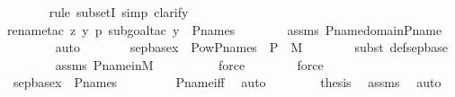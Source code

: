 \begin{isabellebody}
\ \ \ \ \ \ \isamarkupfalse%
{\isacharparenleft}{\kern0pt}rule\ subsetI{\isacharcomma}{\kern0pt}\ simp{\isacharcomma}{\kern0pt}\ clarify{\isacharparenright}{\kern0pt}\isanewline
\ \ \ \ \ \ \isamarkupfalse%
{\isacharparenleft}{\kern0pt}rename{\isacharunderscore}{\kern0pt}tac\ z\ y\ p{\isacharcomma}{\kern0pt}\ subgoal{\isacharunderscore}{\kern0pt}tac\ {\isachardoublequoteopen}y\ {\isasymin}\ P{\isacharunderscore}{\kern0pt}names{\isachardoublequoteclose}{\isacharparenright}{\kern0pt}\isanewline
\ \ \ \ \ \ \isamarkupfalse%
\ assms\ P{\isacharunderscore}{\kern0pt}name{\isacharunderscore}{\kern0pt}domain{\isacharunderscore}{\kern0pt}P{\isacharunderscore}{\kern0pt}name\isanewline
\ \ \ \ \ \ \isamarkupfalse%
\ auto\isanewline
\ \ \ \ \isamarkupfalse%
\ \isamarkupfalse%
\ {\isachardoublequoteopen}sep{\isacharunderscore}{\kern0pt}base{\isacharparenleft}{\kern0pt}x{\isacharparenright}{\kern0pt}\ {\isasymsubseteq}\ Pow{\isacharparenleft}{\kern0pt}P{\isacharunderscore}{\kern0pt}names\ {\isasymtimes}\ P{\isacharparenright}{\kern0pt}\ {\isasyminter}\ M{\isachardoublequoteclose}\ \isanewline
\ \ \ \ \ \ \isamarkupfalse%
{\isacharparenleft}{\kern0pt}subst\ def{\isacharunderscore}{\kern0pt}sep{\isacharunderscore}{\kern0pt}base{\isacharparenright}{\kern0pt}\isanewline
\ \ \ \ \ \ \isamarkupfalse%
\ assms\ P{\isacharunderscore}{\kern0pt}name{\isacharunderscore}{\kern0pt}in{\isacharunderscore}{\kern0pt}M\ \isanewline
\ \ \ \ \ \ \ \isamarkupfalse%
\ force\isanewline
\ \ \ \ \ \ \isamarkupfalse%
\ force\isanewline
\ \ \ \ \ \ \isamarkupfalse%
\isanewline
\ \ \ \ \isamarkupfalse%
\ \isamarkupfalse%
\ {\isachardoublequoteopen}sep{\isacharunderscore}{\kern0pt}base{\isacharparenleft}{\kern0pt}x{\isacharparenright}{\kern0pt}\ {\isasymsubseteq}\ P{\isacharunderscore}{\kern0pt}names{\isachardoublequoteclose}\ \isanewline
\ \ \ \ \ \ \isamarkupfalse%
\ P{\isacharunderscore}{\kern0pt}name{\isacharunderscore}{\kern0pt}iff\ \isamarkupfalse%
\ auto\isanewline
\ \ \isamarkupfalse%
\isanewline
\ \ \isamarkupfalse%
\ \isamarkupfalse%
\ {\isacharquery}{\kern0pt}thesis\ \isamarkupfalse%
\ assms\ \isamarkupfalse%
\ auto\isanewline
{}\isamarkupfalse%
%
\endisatagproof
{\isafoldproof}%
%
\isadelimproof
\isanewline
%
\endisadelimproof
\ \ \isanewline

\end{isabellebody}
